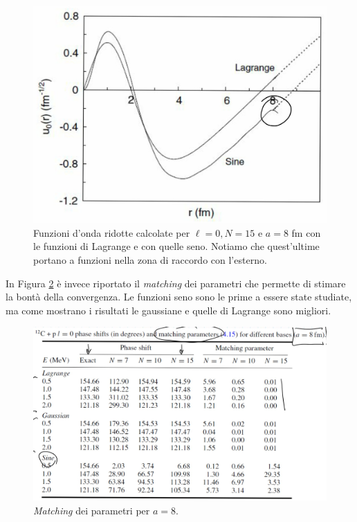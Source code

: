 \begin{figure}[h]
	\centering
	\includegraphics[scale=0.2]{Immagini/0414_metodi2.png}
	\caption{Funzioni d'onda ridotte calcolate per $\ell=0,N=15$ e $a=8$ fm con le funzioni di Lagrange e con quelle seno. Notiamo che quest'ultime portano a funzioni  nella zona di raccordo con l'esterno.}
	\label{0414_p12C-2}
\end{figure}
\noindent In Figura \ref{0414_p12C-3} è invece riportato il \textit{matching} dei parametri che permette di stimare la bontà della convergenza. Le funzioni seno sono le prime a essere state studiate, ma come mostrano i risultati le gaussiane e quelle di Lagrange sono migliori.
\begin{figure}[h]
	\centering
	\includegraphics[scale=0.2]{Immagini/0414_metodi3.png}
	\caption{\textit{Matching} dei parametri per $a=8$.}
	\label{0414_p12C-3}
\end{figure}


